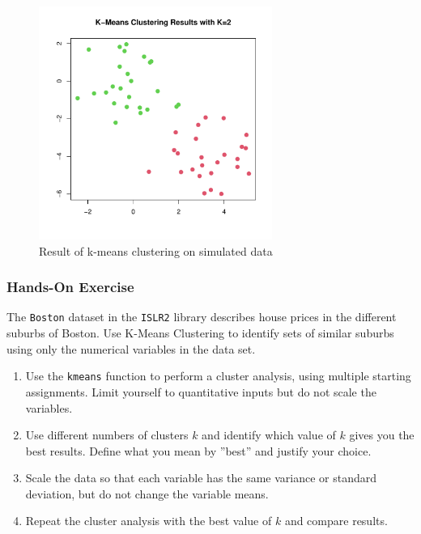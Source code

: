 \begin{figure}
\centering

\includegraphics[height=3in]{kmeans.pdf}
\caption{Result of k-means clustering on simulated data}
\label{fig:kmeans4}
\end{figure}


\begin{tcolorbox}[colback=code]
\subsubsection*{Hands-On Exercise} 
The \texttt{Boston} dataset in the \texttt{ISLR2} library describes house prices in the different suburbs of Boston. Use K-Means Clustering to identify sets of similar suburbs using only the numerical variables in the data set.
\begin{enumerate}
   \item Use the \texttt{kmeans} function to perform a cluster analysis, using multiple starting assignments. Limit yourself to quantitative inputs but do not scale the variables.
   \item Use different numbers of clusters $k$ and identify which value of $k$ gives you the best results. Define what you mean by ''best'' and justify your choice.
   \item Scale the data so that each variable has the same variance or standard deviation, but do not change the variable means. 
   \item Repeat the cluster analysis with the best value of $k$ and compare results.\end{enumerate}
\end{tcolorbox}

